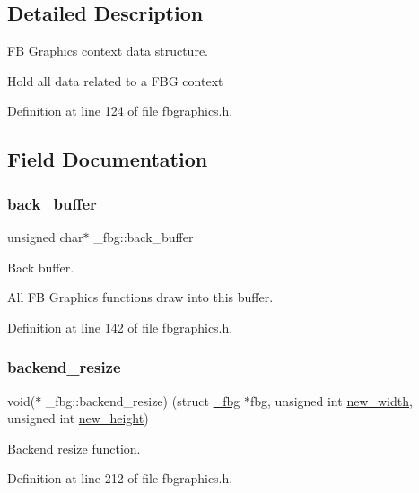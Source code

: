\subsection{Detailed Description}
FB Graphics context data structure. 

Hold all data related to a F\+BG context 

Definition at line 124 of file fbgraphics.\+h.



\subsection{Field Documentation}
\mbox{\label{struct__fbg_a907e7fc97965b972c17114c885e53735}} 
\subsubsection{\texorpdfstring{back\+\_\+buffer}{back\_buffer}}
{\footnotesize\ttfamily unsigned char$\ast$ \+\_\+fbg\+::back\+\_\+buffer}



Back buffer. 

All FB Graphics functions draw into this buffer. 

Definition at line 142 of file fbgraphics.\+h.

\mbox{\label{struct__fbg_aef07a92ae059ea2a43653f4d0c5d928e}} 
\subsubsection{\texorpdfstring{backend\+\_\+resize}{backend\_resize}}
{\footnotesize\ttfamily void($\ast$ \+\_\+fbg\+::backend\+\_\+resize) (struct \mbox{\hyperlink{struct__fbg}{\+\_\+fbg}} $\ast$fbg, unsigned int \mbox{\hyperlink{struct__fbg_a95859bd418a5cfff155cdb1421d295ef}{new\+\_\+width}}, unsigned int \mbox{\hyperlink{struct__fbg_a509aa5f8f0a94d8313bb4da777aa64bc}{new\+\_\+height}})}



Backend resize function. 



Definition at line 212 of file fbgraphics.\+h.

